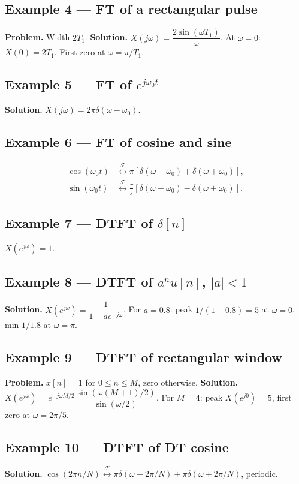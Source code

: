 \documentclass[11pt]{article}
\newcommand{\FT}{\overset{\mathcal{F}}{\longleftrightarrow}}
\begin{document}
\subsection{Example 4 --- FT of a rectangular pulse}
\textbf{Problem.} Width $2T_1$.
\textbf{Solution.} $X(j\omega)=\dfrac{2\sin(\omega T_1)}{\omega}$. At $\omega=0$: $X(0)=2T_1$. First zero at $\omega=\pi/T_1$.

\subsection{Example 5 --- FT of $e^{j\omega_0 t}$}
\textbf{Solution.} $X(j\omega)=2\pi\delta(\omega-\omega_0)$.

\subsection{Example 6 --- FT of cosine and sine}
\begin{align*}
\cos(\omega_0 t)&\FT\pi[\delta(\omega-\omega_0)+\delta(\omega+\omega_0)],\\
\sin(\omega_0 t)&\FT\frac{\pi}{j}[\delta(\omega-\omega_0)-\delta(\omega+\omega_0)].
\end{align*}

\subsection{Example 7 --- DTFT of $\delta[n]$}
$X(e^{j\omega})=1$.

\subsection{Example 8 --- DTFT of $a^n u[n]$, $|a|<1$}
\textbf{Solution.} $X(e^{j\omega})=\dfrac{1}{1-ae^{-j\omega}}$. For $a=0.8$: peak $1/(1-0.8)=5$ at $\omega=0$, min $1/1.8$ at $\omega=\pi$.

\subsection{Example 9 --- DTFT of rectangular window}
\textbf{Problem.} $x[n]=1$ for $0\le n\le M$, zero otherwise.
\textbf{Solution.} $X(e^{j\omega})=e^{-j\omega M/2}\dfrac{\sin(\omega(M+1)/2)}{\sin(\omega/2)}$. For $M=4$: peak $X(e^{j0})=5$, first zero at $\omega=2\pi/5$.

\subsection{Example 10 --- DTFT of DT cosine}
\textbf{Solution.} $\cos(2\pi n/N)\FT \pi\delta(\omega-2\pi/N)+\pi\delta(\omega+2\pi/N)$, periodic.
\end{document}
